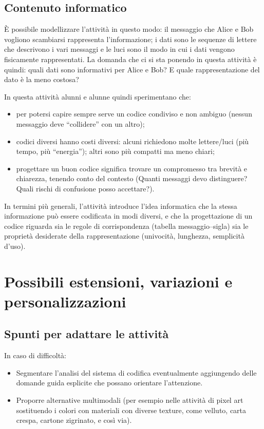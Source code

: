 \subsection{Contenuto informatico}\label{contenuto-informatico-8}

È possibile modellizzare l'attività in questo modo: il messaggio che Alice e Bob vogliono scambiarsi rappresenta l'informazione; i dati sono le sequenze di lettere che descrivono i vari messaggi e le luci sono il modo in cui i dati vengono fisicamente rappresentati. La domanda che ci si sta ponendo in questa attività è quindi: quali dati sono informativi per Alice e Bob? E quale rappresentazione del dato è la meno costosa?

In questa attività alunni e alunne quindi sperimentano che:

\begin{itemize}
\item
  per potersi capire sempre serve un codice condiviso e non ambiguo (nessun messaggio deve ``collidere'' con un altro);
\item
  codici diversi hanno costi diversi: alcuni richiedono molte lettere/luci (più tempo, più ``energia''); altri sono più compatti ma meno chiari;
\item
  progettare un buon codice significa trovare un compromesso tra brevità e chiarezza, tenendo conto del contesto (Quanti messaggi devo distinguere? Quali rischi di confusione posso accettare?).
\end{itemize}

In termini più generali, l'attività introduce l'idea informatica che la stessa informazione può essere codificata in modi diversi, e che la progettazione di un codice riguarda sia le regole di corrispondenza (tabella messaggio--sigla) sia le proprietà desiderate della rappresentazione (univocità, lunghezza, semplicità d'uso).

\section{Possibili estensioni, variazioni e personalizzazioni }\label{possibili-estensioni-variazioni-e-personalizzazioni-2}


\subsection{Spunti per adattare le attività}

In caso di difficoltà:


\begin{itemize}
\item
  Segmentare l'analisi del sistema di codifica eventualmente aggiungendo delle domande guida esplicite che possano orientare l'attenzione.
\item
  Proporre alternative multimodali (per esempio nelle attività di pixel art sostituendo i colori con materiali con diverse texture, come velluto, carta crespa, cartone zigrinato, e così via).
\end{itemize}

